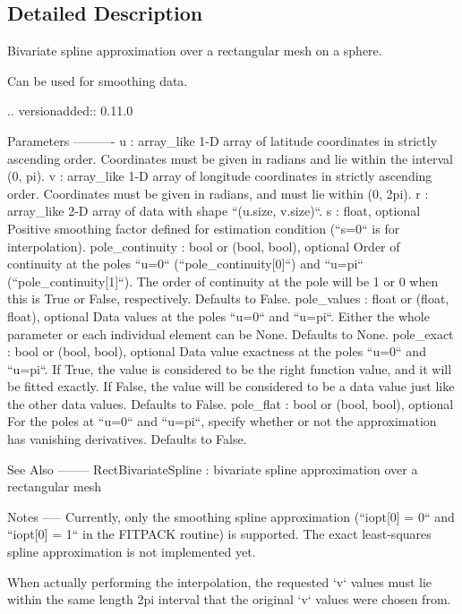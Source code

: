\subsection{Detailed Description}
\begin{DoxyVerb}Bivariate spline approximation over a rectangular mesh on a sphere.

Can be used for smoothing data.

.. versionadded:: 0.11.0

Parameters
----------
u : array_like
    1-D array of latitude coordinates in strictly ascending order.
    Coordinates must be given in radians and lie within the interval
    (0, pi).
v : array_like
    1-D array of longitude coordinates in strictly ascending order.
    Coordinates must be given in radians, and must lie within (0, 2pi).
r : array_like
    2-D array of data with shape ``(u.size, v.size)``.
s : float, optional
    Positive smoothing factor defined for estimation condition
    (``s=0`` is for interpolation).
pole_continuity : bool or (bool, bool), optional
    Order of continuity at the poles ``u=0`` (``pole_continuity[0]``) and
    ``u=pi`` (``pole_continuity[1]``).  The order of continuity at the pole
    will be 1 or 0 when this is True or False, respectively.
    Defaults to False.
pole_values : float or (float, float), optional
    Data values at the poles ``u=0`` and ``u=pi``.  Either the whole
    parameter or each individual element can be None.  Defaults to None.
pole_exact : bool or (bool, bool), optional
    Data value exactness at the poles ``u=0`` and ``u=pi``.  If True, the
    value is considered to be the right function value, and it will be
    fitted exactly. If False, the value will be considered to be a data
    value just like the other data values.  Defaults to False.
pole_flat : bool or (bool, bool), optional
    For the poles at ``u=0`` and ``u=pi``, specify whether or not the
    approximation has vanishing derivatives.  Defaults to False.

See Also
--------
RectBivariateSpline : bivariate spline approximation over a rectangular
    mesh

Notes
-----
Currently, only the smoothing spline approximation (``iopt[0] = 0`` and
``iopt[0] = 1`` in the FITPACK routine) is supported.  The exact
least-squares spline approximation is not implemented yet.

When actually performing the interpolation, the requested `v` values must
lie within the same length 2pi interval that the original `v` values were
chosen from.


\end{DoxyVerb}
